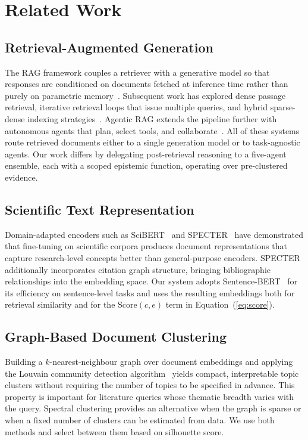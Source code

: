 \documentclass[conference]{IEEEtran}
\begin{document}
\section{Related Work}

\subsection{Retrieval-Augmented Generation}
The RAG framework couples a retriever with a generative model so that
responses are conditioned on documents fetched at inference time rather than
purely on parametric memory~\cite{lewis2020rag}. Subsequent work has explored
dense passage retrieval, iterative retrieval loops that issue multiple
queries, and hybrid sparse-dense indexing strategies~\cite{zhao2024ragsurvey}.
Agentic RAG extends the pipeline further with autonomous agents that plan,
select tools, and collaborate~\cite{singh2025agenticrag}. All of these systems
route retrieved documents either to a single generation model or to
task-agnostic agents. Our work differs by delegating post-retrieval reasoning
to a five-agent ensemble, each with a scoped epistemic function, operating
over pre-clustered evidence.

\subsection{Scientific Text Representation}
Domain-adapted encoders such as SciBERT~\cite{beltagy2019scibert} and
SPECTER~\cite{cohan2020specter} have demonstrated that fine-tuning on
scientific corpora produces document representations that capture
research-level concepts better than general-purpose encoders. SPECTER
additionally incorporates citation graph structure, bringing bibliographic
relationships into the embedding space. Our system adopts
Sentence-BERT~\cite{reimers2019sbert} for its efficiency on sentence-level
tasks and uses the resulting embeddings both for retrieval similarity and for
the $\mathrm{Score}(c,e)$ term in Equation~(\ref{eq:score}).

\subsection{Graph-Based Document Clustering}
Building a $k$-nearest-neighbour graph over document embeddings and applying
the Louvain community detection algorithm~\cite{blondel2008louvain} yields
compact, interpretable topic clusters without requiring the number of topics
to be specified in advance. This property is important for literature queries
whose thematic breadth varies with the query. Spectral clustering provides an
alternative when the graph is sparse or when a fixed number of clusters can be
estimated from data. We use both methods and select between them based on
silhouette score.
\end{document}
